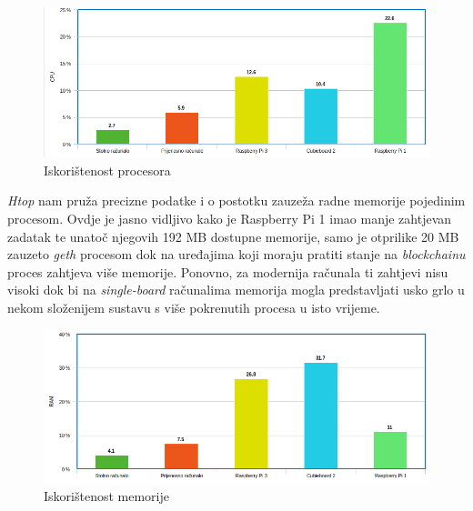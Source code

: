 \documentclass[times, utf8, zavrsni, numeric]{fer}
\begin{document}
\begin{figure}[ht]
  \caption{Iskorištenost procesora}
  \centering
  \includegraphics[width=\textwidth]{cpuUtil.png}
\end{figure}

\emph{Htop} nam pruža precizne podatke i o postotku zauzeža radne memorije pojedinim procesom. Ovdje je jasno vidljivo kako je Raspberry Pi 1 imao manje zahtjevan
zadatak te unatoč njegovih 192 MB dostupne memorije, samo je otprilike 20 MB zauzeto \emph{geth} procesom dok na uređajima koji moraju pratiti stanje na \emph{blockchainu}
proces zahtjeva više memorije. Ponovno, za modernija računala ti zahtjevi nisu visoki dok bi na \emph{single-board} računalima memorija mogla predstavljati usko grlo
u nekom složenijem sustavu s više pokrenutih procesa u isto vrijeme.

\begin{figure}[ht]
  \caption{Iskorištenost memorije}
  \centering
  \includegraphics[width=\textwidth]{ramUtil.png}
\end{figure}
\end{document}
